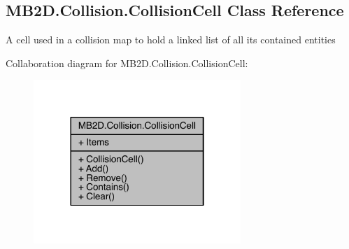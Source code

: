 \hypertarget{class_m_b2_d_1_1_collision_1_1_collision_cell}{}\subsection{M\+B2\+D.\+Collision.\+Collision\+Cell Class Reference}
\label{class_m_b2_d_1_1_collision_1_1_collision_cell}


A cell used in a collision map to hold a linked list of all its contained entities  




Collaboration diagram for M\+B2\+D.\+Collision.\+Collision\+Cell\+:
\nopagebreak
\begin{figure}[H]
\begin{center}
\leavevmode
\includegraphics[width=222pt]{class_m_b2_d_1_1_collision_1_1_collision_cell__coll__graph}
\end{center}
\end{figure}
